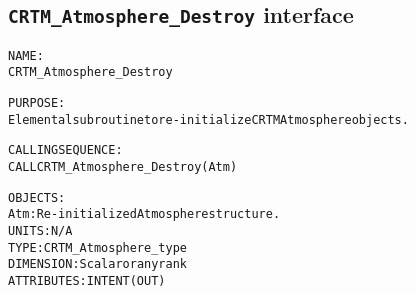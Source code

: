 \subsection{\texttt{CRTM\_Atmosphere\_Destroy} interface}
  \label{sec:CRTM_Atmosphere_Destroy_interface}
  \begin{alltt}
 
  NAME:
        CRTM_Atmosphere_Destroy
 
  PURPOSE:
        Elemental subroutine to re-initialize CRTM Atmosphere objects.
 
  CALLING SEQUENCE:
        CALL CRTM_Atmosphere_Destroy( Atm )
 
  OBJECTS:
        Atm:          Re-initialized Atmosphere structure.
                      UNITS:      N/A
                      TYPE:       CRTM_Atmosphere_type
                      DIMENSION:  Scalar or any rank
                      ATTRIBUTES: INTENT(OUT)
 
  \end{alltt}
